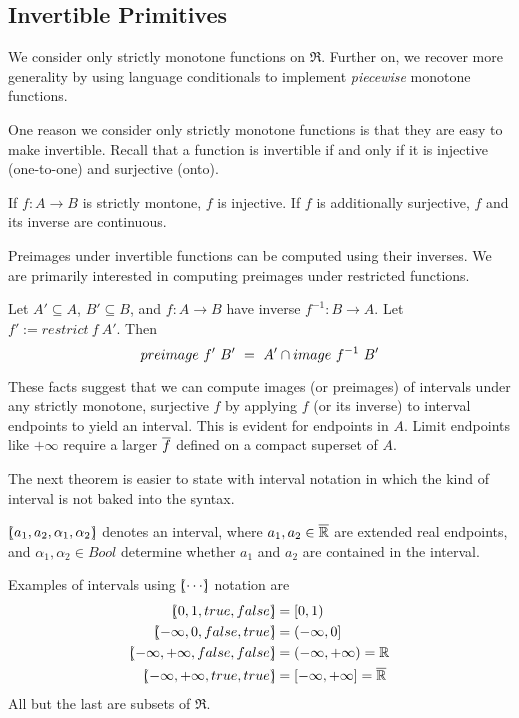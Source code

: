 \documentclass[preprint]{sigplanconf}
\DeclarePairedDelimiter{\ivl}{[\mspace{-4.5mu}(}{)\mspace{-4.5mu}]}
\begin{document}
\subsection{Invertible Primitives}

We consider only strictly monotone functions on $\Re$.
Further on, we recover more generality by using language conditionals to implement \emph{piecewise} monotone functions.

One reason we consider only strictly monotone functions is that they are easy to make invertible.
Recall that a function is invertible if and only if it is injective (one-to-one) and surjective (onto).

\begin{lemma}
\label{lem:monotone-implies-invertible}
If $f : A \to B$ is strictly montone, $f$ is injective.
If $f$ is additionally surjective, $f$ and its inverse are continuous.
\end{lemma}

Preimages under invertible functions can be computed using their inverses.
We are primarily interested in computing preimages under restricted functions.

\begin{lemma}
\label{lem:invertible-function-preimages}
Let $A' \subseteq A$, $B' \subseteq B$, and $f : A \to B$ have inverse $f^{-1} : B \to A$.
Let $f' := restrict~f~A'$. Then
\begin{equation}
	preimage~f'~B'\ =\ A' \cap image~f^{-1}~B'
\end{equation}
\end{lemma}

These facts suggest that we can compute images (or preimages) of intervals under any strictly monotone, surjective $f$ by applying $f$ (or its inverse) to interval endpoints to yield an interval.
This is evident for endpoints in $A$.
Limit endpoints like $+\infty$ require a larger $\cl{f}$ defined on a compact superset of $A$.

The next theorem is easier to state with interval notation in which the kind of interval is not baked into the syntax.

\begin{definition}[interval]
$\ivl{a_1,a_2,\alpha_1,\alpha_2}$ denotes an interval, where $a_1,a_2 \in \cl{\Re}$ are extended real endpoints, and $\alpha_1,\alpha_2 \in Bool$ determine whether $a_1$ and $a_2$ are contained in the interval.
\end{definition}

\begin{example}
Examples of intervals using $\ivl{\cdots}$ notation are
\begin{equation}
\begin{aligned}
	\ivl{0,1,true,false} &= [0,1) \\
	\ivl{-\infty,0,false,true} &= (-\infty,0] \\
	\ivl{-\infty,+\infty,false,false} &= (-\infty,+\infty) = \Re \\
	\ivl{-\infty,+\infty,true,true} &= [-\infty,+\infty] = \cl{\Re}
\end{aligned}
\end{equation}
All but the last are subsets of $\Re$.
\exampleqed
\end{example}
\end{document}
